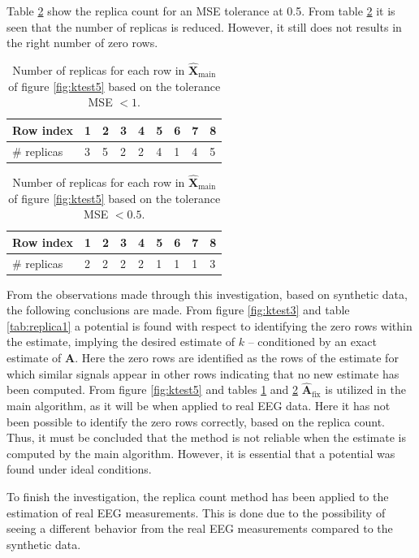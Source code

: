 Table \ref{tab:replica6} show the replica count for an MSE tolerance at 0.5. 
From table \ref{tab:replica6} it is seen that the number of replicas is reduced.
However, it still does not results in the right number of zero rows.  
\begin{table}[H]
\center
\begin{tabular}{|l|l|l|l|l|l|l|l|l|}
\hline
Row index   & 1 & 2 & 3 & 4 & 5 & 6 & 7 & 8 \\ \hline
\# replicas & 3 & 5 & 2 & 2 & 4 & 1 & 4 & 5 \\ \hline
\end{tabular}
\caption{Number of replicas for each row in $\hat{\mathbf{X}}_{\text{main}}$ of figure \ref{fig:ktest5} based on the tolerance MSE $< 1$.}
\label{tab:replica5}
\end{table}
\noindent
\begin{table}[H]
\center
\begin{tabular}{|l|l|l|l|l|l|l|l|l|}
\hline
Row index   & 1 & 2 & 3 & 4 & 5 & 6 & 7 & 8 \\ \hline
\# replicas & 2 & 2 & 2 & 2 & 1 & 1 & 1 & 3 \\ \hline
\end{tabular}
\caption{Number of replicas for each row in $\hat{\mathbf{X}}_{\text{main}}$ of figure \ref{fig:ktest5} based on the tolerance MSE $< 0.5$.}
\label{tab:replica6}
\end{table}
\noindent
From the observations made through this investigation, based on synthetic data, the following conclusions are made.
From figure \ref{fig:ktest3} and table \ref{tab:replica1} a potential is found with respect to identifying the zero rows within the estimate, implying the desired estimate of $k$ -- conditioned by an exact estimate of $\textbf{A}$. 
Here the zero rows are identified as the rows of the estimate for which similar signals appear in other rows indicating that no new estimate has been computed. 
From figure \ref{fig:ktest5} and tables \ref{tab:replica5} and \ref{tab:replica6} $\hat{\mathbf{A}}_{\text{fix}}$ is utilized in the main algorithm, as it will be when applied to real EEG data. 
Here it has not been possible to identify the zero rows correctly, based on the replica count. 
Thus, it must be concluded that the method is not reliable when the estimate is computed by the main algorithm. 
However, it is essential that a potential was found under ideal conditions.

To finish the investigation, the replica count method has been applied to the estimation of real EEG measurements. This is done due to the possibility of seeing a different behavior from the real EEG measurements compared to the synthetic data. 

